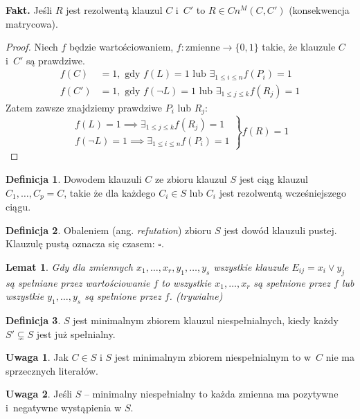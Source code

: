 \documentclass[10pt,a4paper]{article}
\theoremstyle{plain}
\newtheorem{lemma}{Lemat}
\theoremstyle{definition}
\newtheorem*{definition}{Definicja}
\newtheorem*{remark}{Uwaga}
\newcommand{\header}[1]{\noindent\textbf{#1}}
\begin{document}
\header{Fakt.} Jeśli $R$ jest rezolwentą klauzul $C$ i~$C'$ to $R \in
Cn^M(C,C')$ (konsekwencja matrycowa).\\
\begin{proof}
Niech $f$ będzie wartościowaniem, $f : \text{zmienne} \rightarrow \{0, 1\}$
takie, że klauzule $C$ i~$C'$ są prawdziwe.
\begin{align*}
  f(C) &=1,\text{ gdy }f(L) = 1\text{ lub }\exists_{1\leq i \leq n} f(P_i) = 1\\
  f(C') &=1,\text{ gdy }f(\neg L) = 1\text{ lub }\exists_{1\leq j \leq k} f(R_j) = 1
\end{align*}
Zatem zawsze znajdziemy prawdziwe $P_i$ lub $R_j$:
\[\left.
  \begin{array}{l}
  f(L) = 1 \implies \exists_{1\leq j\leq k} f(R_j) = 1\\
  f(\neg L) = 1 \implies \exists_{1\leq i\leq n} f(P_i) = 1
  \end{array}
  \right\} f(R) = 1
\]
\end{proof}

\begin{definition}
Dowodem klauzuli $C$ ze zbioru klauzul $S$ jest ciąg klauzul $C_1, \ldots, C_p = C$, takie że dla każdego $C_i \in S$ lub $C_i$ jest rezolwentą wcześniejszego ciągu.
\end{definition}


\begin{definition}
  Obaleniem (ang. \emph{refutation}) zbioru $S$ jest dowód klauzuli pustej.
  Klauzulę pustą oznacza się czasem: $\square$.
\end{definition}

\begin{lemma}
  Gdy dla zmiennych $x_1, \ldots, x_r, y_1, \ldots, y_s$ wszystkie
  klauzule $E_{ij} = x_i \vee y_j$ są spełniane przez wartościowanie $f$
  to wszystkie $x_1, \ldots, x_r$ są spełnione przez $f$ lub wszystkie
  $y_1, \ldots, y_s$ są spełnione przez $f$. (trywialne)
\end{lemma}


\begin{definition}
$S$ jest minimalnym zbiorem klauzul niespełnialnych, kiedy każdy $S' \subsetneq S$ jest już spełnialny.
\end{definition}

\begin{remark}
  Jak $C \in S$ i $S$ jest minimalnym zbiorem niespełnialnym to w~$C$ nie ma
  sprzecznych literałów.
\end{remark}
\begin{remark}
  Jeśli $S$ -- minimalny niespełnialny to każda zmienna ma pozytywne i~negatywne
  wystąpienia w $S$.
\end{remark}
\end{document}
